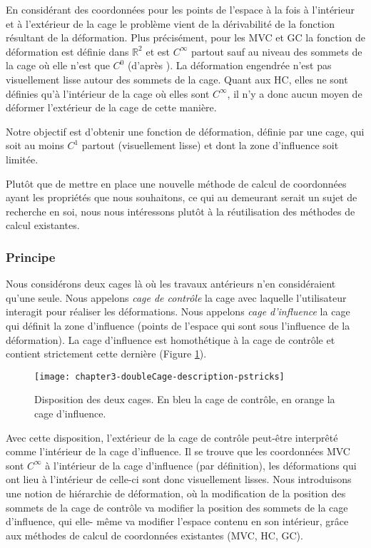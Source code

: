 En considérant des coordonnées pour les points de l'espace à la fois à
l'intérieur et à l'extérieur de la cage le problème vient de la dérivabilité
de la fonction résultant de la déformation. Plus précisément, pour les MVC et
GC la fonction de déformation est définie dans $\mathbb{R}^2$ et est
$C^{\infty}$ partout sauf au niveau des sommets de la cage où elle n'est que
$C^0$ (d'après \cite{LS08}). La déformation engendrée n'est pas visuellement lisse autour des
sommets de la cage. Quant aux HC, elles ne sont définies qu'à l'intérieur de
la cage où elles sont $C^{\infty}$, il n'y a donc aucun moyen de déformer
l'extérieur de la cage de cette manière.

Notre objectif est d'obtenir une fonction de déformation, définie par une
cage, qui soit au moins $C^1$ partout (visuellement lisse) et dont la zone
d'influence soit limitée.

Plutôt que de mettre en place une nouvelle méthode de calcul de coordonnées
ayant les propriétés que nous souhaitons, ce qui au demeurant serait un sujet
de recherche en soi, nous nous intéressons plutôt à la réutilisation des
méthodes de calcul existantes.

\subsubsection{Principe}

Nous considérons deux cages là où les travaux antérieurs n'en considéraient
qu'une seule. Nous appelons \textit{cage de contrôle} la cage avec laquelle
l'utilisateur interagit pour réaliser les déformations. Nous appelons
\textit{cage d'influence} la cage qui définit la zone d'influence (points de
l'espace qui sont sous l'influence de la déformation). La cage d'influence est
homothétique à la cage de contrôle et contient strictement cette dernière
(Figure \ref{MELDou}).

\begin{figure}[ht]
  \begin{center}
    \texttt{[image: chapter3-doubleCage-description-pstricks]}

    \caption[Disposition des cages de contrôle et d'influence] {Disposition
des deux cages. En bleu la cage de contrôle, en orange la cage d'influence.}

    \label{MELDou}
  \end{center}
\end{figure}

Avec cette disposition, l'extérieur de la cage de contrôle peut-être
interprêté comme l'intérieur de la cage d'influence. Il se trouve que les
coordonnées MVC sont $C^{\infty}$ à l'intérieur de la cage d'influence (par
définition), les déformations qui ont lieu à l'intérieur de celle-ci sont donc
visuellement lisses. Nous introduisons une notion de hiérarchie de déformation, où
la modification de la position des sommets de la cage de contrôle va modifier
la position des sommets de la cage d'influence, qui elle- même va modifier
l'espace contenu en son intérieur, grâce aux méthodes de calcul de coordonnées
existantes (MVC, HC, GC). \\

